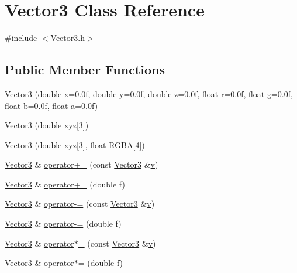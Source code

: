 \hypertarget{class_vector3}{\section{Vector3 Class Reference}
\label{class_vector3}
}


{\ttfamily \#include $<$Vector3.\-h$>$}

\subsection*{Public Member Functions}
\begin{DoxyCompactItemize}
\item 
\hyperlink{class_vector3_a4fa53cd9ec543e9bd6c8304e87303ce3}{Vector3} (double \hyperlink{gl3_8h_a92d0386e5c19fb81ea88c9f99644ab1d}{x}=0.\-0f, double y=0.\-0f, double z=0.\-0f, float r=0.\-0f, float g=0.\-0f, float b=0.\-0f, float a=0.\-0f)
\item 
\hyperlink{class_vector3_a1116d2e181b0226afb2a68bb54fbdaca}{Vector3} (double xyz\mbox{[}3\mbox{]})
\item 
\hyperlink{class_vector3_a8ecc8e350589010821aef55516765cdf}{Vector3} (double xyz\mbox{[}3\mbox{]}, float R\-G\-B\-A\mbox{[}4\mbox{]})
\item 
\hyperlink{class_vector3}{Vector3} \& \hyperlink{class_vector3_a105b045dd7469eac3c90e8df11a81999}{operator+=} (const \hyperlink{class_vector3}{Vector3} \&\hyperlink{gl3_8h_a14cfbe2fc2234f5504618905b69d1e06}{v})
\item 
\hyperlink{class_vector3}{Vector3} \& \hyperlink{class_vector3_a6ccc84a70e65457505f799a0fdcd46d5}{operator+=} (double f)
\item 
\hyperlink{class_vector3}{Vector3} \& \hyperlink{class_vector3_a76473ea93f630b84e63b2150bd60b201}{operator-\/=} (const \hyperlink{class_vector3}{Vector3} \&\hyperlink{gl3_8h_a14cfbe2fc2234f5504618905b69d1e06}{v})
\item 
\hyperlink{class_vector3}{Vector3} \& \hyperlink{class_vector3_a26ad5830cf0dd55fa3cadb378e2756b3}{operator-\/=} (double f)
\item 
\hyperlink{class_vector3}{Vector3} \& \hyperlink{class_vector3_a48bda2370f2b649018795021c29e679c}{operator$\ast$=} (const \hyperlink{class_vector3}{Vector3} \&\hyperlink{gl3_8h_a14cfbe2fc2234f5504618905b69d1e06}{v})
\item 
\hyperlink{class_vector3}{Vector3} \& \hyperlink{class_vector3_a8b30951eb85503a0aec6b6727a8b32ff}{operator$\ast$=} (double f)
\item 

\end{DoxyCompactItemize}
